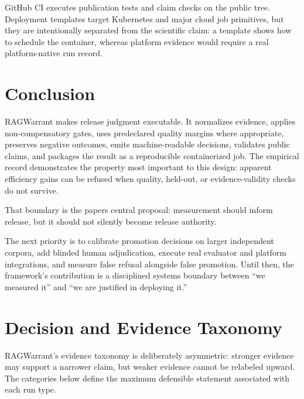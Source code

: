 \documentclass[11pt]{article}
\begin{document}
GitHub CI executes publication tests and claim checks on the public
tree. Deployment templates target Kubernetes and major cloud job
primitives, but they are intentionally separated from the scientific
claim: a template shows how to schedule the container, whereas platform
evidence would require a real platform-native run record.

\section{Conclusion}\label{sec:conclusion}

RAGWarrant makes release judgment executable. It normalizes evidence,
applies non-compensatory gates, uses predeclared quality margins where
appropriate, preserves negative outcomes, emits machine-readable
decisions, validates public claims, and packages the result as a
reproducible containerized job. The empirical record demonstrates the
property most important to this design: apparent efficiency gains can be
refused when quality, held-out, or evidence-validity checks do not
survive.

That boundary is the paper\textquotesingle s central proposal:
measurement should inform release, but it should not silently become
release authority.

The next priority is to calibrate promotion decisions on larger
independent corpora, add blinded human adjudication, execute real
evaluator and platform integrations, and measure false refusal alongside
false promotion. Until then, the framework's
contribution is a disciplined systems boundary between ``we measured
it'' and ``we are justified in deploying it.''

\appendix
\section{Decision and Evidence Taxonomy}\label{app:taxonomy}

RAGWarrant's evidence taxonomy is deliberately
asymmetric: stronger evidence may support a narrower claim, but weaker
evidence cannot be relabeled upward. The categories below define the
maximum defensible statement associated with each run type.
\end{document}
